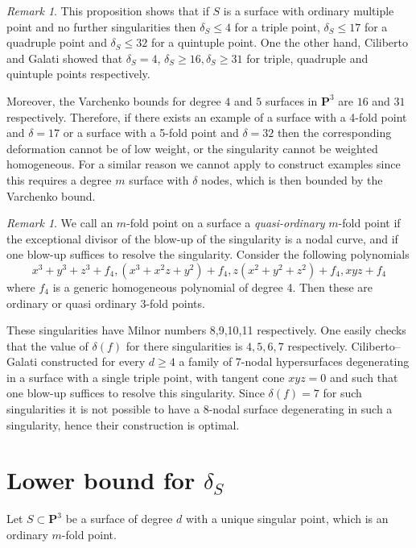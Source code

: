 \documentclass{amsart}
\newcommand{\Ps}{\mathbf{P}}
\theoremstyle{definition}
\theoremstyle{remark}
\newtheorem{remark}[lemma]{Remark}
\begin{document}
\begin{remark} This proposition shows that if $S$ is a surface with ordinary multiple point and no further singularities then  $\delta_S\leq 4$ for a triple point, $\delta_S\leq 17$ for a quadruple point and $\delta_S\leq 32$ for a quintuple point. 
One the other hand, Ciliberto and Galati showed  \cite{CiGa26} that $\delta_S=4$, $\delta_S\geq 16, \delta_S\geq 31$ for triple, quadruple and quintuple points respectively.

Moreover, the Varchenko bounds for degree $4$ and $5$ surfaces in $\Ps^3$ are $16$ and $31$ respectively. Therefore, if  there exists an example of a surface with a 4-fold point and $\delta=17$ or a surface with a 5-fold point and  $\delta=32$ then the corresponding  deformation cannot be of low weight, or the singularity cannot be weighted homogeneous. For a similar reason we cannot apply \cite[Theorem 3.3]{CiGa26} to construct examples since this requires a degree $m$ surface with $\delta$ nodes, which is then bounded by the Varchenko bound.
\end{remark}

\begin{remark} We call an $m$-fold point on a surface a \emph{quasi-ordinary} $m$-fold point  if the exceptional divisor of the blow-up of the singularity is a nodal curve, and if one blow-up suffices to resolve the singularity. 
Consider the following polynomials
\[ x^3+y^3+z^3+f_4, (x^3+x^2z+y^2)+f_4, z(x^2+y^2+z^2)+f_4, xyz+f_4\]
where $f_4$ is a generic homogeneous polynomial of degree 4. Then these are ordinary or quasi ordinary 3-fold points.

These singularities have Milnor numbers 8,9,10,11 respectively. One easily checks that the value of $\delta(f)$ for there singularities is $4,5,6,7$ respectively.
Ciliberto--Galati \cite{CiGa26} constructed for every $d\geq 4$ a family of 7-nodal hypersurfaces degenerating in a surface with a single triple point, with tangent cone $xyz=0$ and such that one blow-up suffices to resolve this singularity. 
Since $\delta(f)=7$ for such singularities  it is not possible to have a 8-nodal surface degenerating in such a singularity, hence their construction is optimal.
\end{remark}

\section{Lower bound for $\delta_S$}\label{secLower}
Let $S\subset \Ps^3$ be a surface of degree $d$ with a unique singular point, which is an ordinary $m$-fold point.
\end{document}
